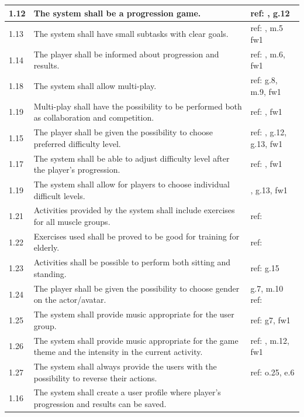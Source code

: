 \begin{table} [H]
\centering
\begin{tabular}{|>{\raggedright}p{}|p{}|p{2cm}|}
\hline
1.12 & The system shall be a progression game. & ref: \cite{understandingvg} \cite{sweetser}, g.12 \\ \hline
1.13 & The system shall have small subtasks with clear goals. & ref: \cite{sweetser}, m.5 fw1\\ \hline
1.14 & The player shall be informed about progression and results. & ref: \cite{sweetser}, m.6, fw1 \\ \hline
1.18 & The system shall allow multi-play. & ref: g.8, m.9, fw1 \\ \hline
1.19 & Multi-play shall have the possibility to be performed both as collaboration and competition. & ref: \cite{sweetser}, fw1\\ \hline
1.15 & The player shall be given the possibility to choose preferred difficulty level. & ref: \cite{sweetser}, g.12, g.13, fw1\\ \hline
1.17 & The system shall be able to adjust difficulty level after the player's progression. & ref: \cite{sweetser}, fw1 \\ \hline
1.19 & The system shall allow for players to choose individual difficult levels. &  \cite{sweetser}, g.13, fw1\\ \hline
1.21 & Activities provided by the system shall include exercises for all muscle groups. & ref: \cite{guidelines} \\ \hline
1.22 & Exercises used shall be proved to be good for training for elderly. & ref: \cite{project} \\ \hline
1.23 & Activities shall be possible to perform both sitting and standing. & ref: g.15 \\ \hline
1.24 & The player shall be given the possibility to choose gender on the actor/avatar. & g.7, m.10 ref:\\ \hline
1.25 & The system shall provide music appropriate for the user group. & ref: g7, fw1 \\ \hline
1.26 & The system shall provide music appropriate for the game theme and the intensity in the current activity. & ref: \cite{umlapproach}, m.12, fw1 \\ \hline
1.27 & The system shall always provide the users with the possibility to reverse their actions. & ref: o.25, e.6 \\ \hline
1.16 & The system shall create a user profile where player's progression and results can be saved. & \\ \hline

\end{tabular}
\end{table}
